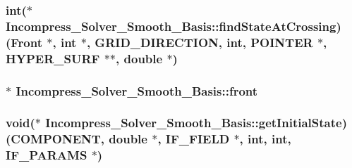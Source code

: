 \subsubsection[{\texorpdfstring{find\+State\+At\+Crossing}{findStateAtCrossing}}]{\setlength{\rightskip}{0pt plus 5cm}int($\ast$ Incompress\+\_\+\+Solver\+\_\+\+Smooth\+\_\+\+Basis\+::find\+State\+At\+Crossing) ({\bf Front} $\ast$, int $\ast$, {\bf G\+R\+I\+D\+\_\+\+D\+I\+R\+E\+C\+T\+I\+ON}, int, {\bf P\+O\+I\+N\+T\+ER} $\ast$, {\bf H\+Y\+P\+E\+R\+\_\+\+S\+U\+RF} $\ast$$\ast$, double $\ast$)}\hypertarget{class_incompress___solver___smooth___basis_a30cd8cfd805153f9576469ac4f78aebe}{}\label{class_incompress___solver___smooth___basis_a30cd8cfd805153f9576469ac4f78aebe}
\subsubsection[{\texorpdfstring{front}{front}}]{$\ast$ Incompress\+\_\+\+Solver\+\_\+\+Smooth\+\_\+\+Basis\+::front\hspace{0.3cm}{\ttfamily [protected]}}\hypertarget{class_incompress___solver___smooth___basis_ab792d371ca86ec9ed21b4c95d1375a0b}{}\label{class_incompress___solver___smooth___basis_ab792d371ca86ec9ed21b4c95d1375a0b}
\subsubsection[{\texorpdfstring{get\+Initial\+State}{getInitialState}}]{\setlength{\rightskip}{0pt plus 5cm}void($\ast$ Incompress\+\_\+\+Solver\+\_\+\+Smooth\+\_\+\+Basis\+::get\+Initial\+State) ({\bf C\+O\+M\+P\+O\+N\+E\+NT}, double $\ast$, {\bf I\+F\+\_\+\+F\+I\+E\+LD} $\ast$, int, int, {\bf I\+F\+\_\+\+P\+A\+R\+A\+MS} $\ast$)}\hypertarget{class_incompress___solver___smooth___basis_a99f48d4fd354fa555ec1d191a7fb568f}{}\label{class_incompress___solver___smooth___basis_a99f48d4fd354fa555ec1d191a7fb568f}
